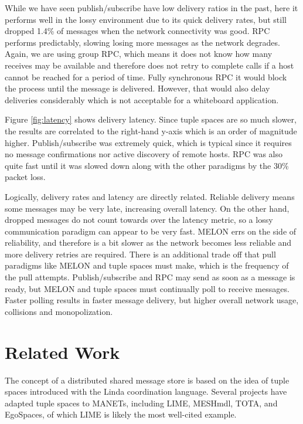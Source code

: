 \documentclass{llncs}
\begin{document}
While we have seen publish/subscribe have low delivery ratios in the past\cite{collins2010quantitative}, here it performs well in the lossy environment due to its quick delivery rates, but still dropped 1.4\% of messages when the network connectivity was good. RPC performs predictably, slowing losing more messages as the network degrades. Again, we are using group RPC, which means it does not know how many receives may be available and therefore does not retry to complete calls if a host cannot be reached for a period of time. Fully synchronous RPC it would block the process until the message is delivered. However, that would also delay deliveries considerably which is not acceptable for a whiteboard application.

Figure \ref{fig:latency} shows delivery latency. Since tuple spaces are so much slower, the results are correlated to the right-hand y-axis which is an order of magnitude higher. Publish/subscribe was extremely quick, which is typical since it requires no message confirmations nor active discovery of remote hosts. RPC was also quite fast until it was slowed down along with the other paradigms by the 30\% packet loss.

Logically, delivery rates and latency are directly related. Reliable delivery means some messages may be very late, increasing overall latency. On the other hand, dropped messages do not count towards over the latency metric, so a lossy communication paradigm can appear to be very fast. MELON errs on the side of reliability, and therefore is a bit slower as the network becomes less reliable and more delivery retries are required. There is an additional trade off that pull paradigms like MELON and tuple spaces must make, which is the frequency of the pull attempts. Publish/subscribe and RPC may send as soon as a message is ready, but MELON and tuple spaces must continually poll to receive messages. Faster polling results in faster message delivery, but higher overall network usage, collisions and monopolization.

\section{Related Work}\label{sec:relatedwork}

The concept of a distributed shared message store is based on the idea of tuple spaces introduced with the Linda\cite{linda} coordination language. Several projects have adapted tuple spaces to MANETs, including LIME\cite{lime}, MESHmdl\cite{meshmdl}, TOTA\cite{tota}, and EgoSpaces\cite{egospaces}, of which LIME is likely the most well-cited example.
\end{document}
